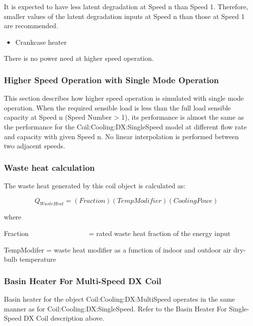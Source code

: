 It is expected to have less latent degradation at Speed n than Speed 1. Therefore, smaller values of the latent degradation inputs at Speed n than those at Speed 1 are recommended.

\begin{itemize}
  \item Crankcase heater
\end{itemize}

There is no power need at higher speed operation.

\subsubsection{Higher Speed Operation with Single Mode Operation}\label{higher-speed-operation-with-single-mode-operation}

This section describes how higher speed operation is simulated with single mode operation. When the required sensible load is less than the full load sensible capacity at Speed n (Speed Number \textgreater{} 1), its performance is almost the same as the performance for the Coil:Cooling:DX:SingleSpeed model at different flow rate and capacity with given Speed n. No linear interpolation is performed between two adjacent speeds.

\subsubsection{Waste heat calculation}\label{waste-heat-calculation-000}

The waste heat generated by this coil object is calculated as:

\begin{equation}
{Q_{WasteHeat}} = (Fraction)(TempModifier)(CoolingPowe)
\end{equation}

where

Fraction~~~~~~~~~~~~~~~~~ = rated waste heat fraction of the energy input

TempModifer = waste heat modifier as a function of indoor and outdoor air dry-bulb temperature

\subsubsection{Basin Heater For Multi-Speed DX Coil}\label{basin-heater-for-multi-speed-dx-coil}

Basin heater for the object Coil:Cooling:DX:MultiSpeed operates in the same manner as for Coil:Cooling:DX:SingleSpeed. Refer to the Basin Heater For Single-Speed DX Coil description above.

